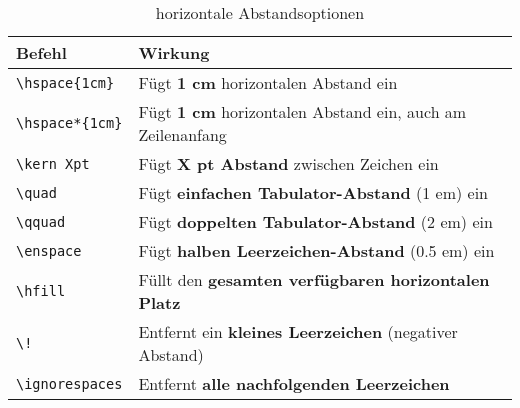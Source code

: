 \begin{table}[h]
    \centering
    \begin{tabular}{lp{10cm}}
        \toprule
        \textbf{Befehl}                        & \textbf{Wirkung}                                                  \\
        \midrule
        \texttt{\textbackslash hspace\{1cm\}}  & Fügt \textbf{1 cm} horizontalen Abstand ein                       \\
        \texttt{\textbackslash hspace*\{1cm\}} & Fügt \textbf{1 cm} horizontalen Abstand ein, auch am Zeilenanfang \\
        \texttt{\textbackslash kern Xpt}       & Fügt \textbf{X pt Abstand} zwischen Zeichen ein                   \\
        \texttt{\textbackslash quad}           & Fügt \textbf{einfachen Tabulator-Abstand} (1 em) ein              \\
        \texttt{\textbackslash qquad}          & Fügt \textbf{doppelten Tabulator-Abstand} (2 em) ein              \\
        \texttt{\textbackslash enspace}        & Fügt \textbf{halben Leerzeichen-Abstand} (0.5 em) ein             \\
        \texttt{\textbackslash hfill}          & Füllt den \textbf{gesamten verfügbaren horizontalen Platz}        \\
        \midrule
        \texttt{\textbackslash !}              & Entfernt ein \textbf{kleines Leerzeichen} (negativer Abstand)     \\
        \texttt{\textbackslash ignorespaces}   & Entfernt \textbf{alle nachfolgenden Leerzeichen}                  \\
        \bottomrule
    \end{tabular}
    \caption{horizontale Abstandsoptionen}
    \label{tab:horizontale_abstaende}
\end{table}